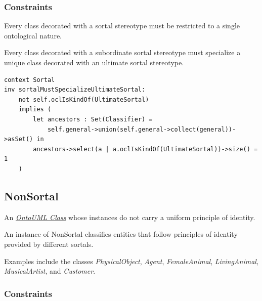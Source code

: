 \subsubsection{Constraints}

\begin{constraint}
\label{constraint:restrictedToSingleNature}
Every class decorated with a sortal stereotype must be restricted to a single ontological nature.

\end{constraint}

\begin{constraint}
\label{constraint:sortalMustSpecializeUltimateSortal}
Every class decorated with a subordinate sortal stereotype must specialize a unique class decorated with an ultimate sortal stereotype.

\begin{lstlisting}[language=OCL]
context Sortal 
inv sortalMustSpecializeUltimateSortal:
    not self.oclIsKindOf(UltimateSortal)
    implies (
        let ancestors : Set(Classifier) =
            self.general->union(self.general->collect(general))->asSet() in
        ancestors->select(a | a.oclIsKindOf(UltimateSortal))->size() = 1
    )
\end{lstlisting}
\end{constraint}

\subsection{NonSortal}
\label{stereotype:nonSortal}

An \hyperref[stereotype:ontoumlClass]{\textit{OntoUML Class}} whose instances do not carry a uniform principle of identity.

An instance of NonSortal classifies entities that follow principles of identity provided by different sortals. 

Examples include the classes \textit{PhysicalObject}, \textit{Agent}, \textit{FemaleAnimal}, \textit{LivingAnimal}, \textit{MusicalArtist}, and \textit{Customer}.

\subsubsection{Constraints}

